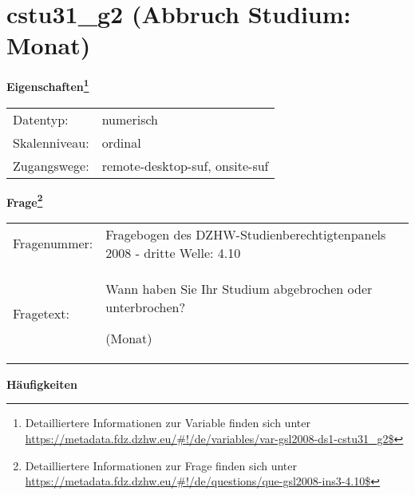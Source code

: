 
    \setcounter{footnote}{0}

    \vspace*{-1.8cm}
	\section{cstu31\_g2 (Abbruch Studium: Monat)}
	\label{section:cstu31_g2}



    \vspace*{0.5cm}
    \noindent\textbf{Eigenschaften\footnote{Detailliertere Informationen zur Variable finden sich unter
		\url{https://metadata.fdz.dzhw.eu/\#!/de/variables/var-gsl2008-ds1-cstu31_g2$}}}\\
	\begin{tabularx}{\hsize}{@{}lX}
	Datentyp: & numerisch \\
	Skalenniveau: & ordinal \\
	Zugangswege: &
	  remote-desktop-suf, 
	  onsite-suf
 \\
    \end{tabularx}



				\vspace*{0.5cm}
                \noindent\textbf{Frage\footnote{Detailliertere Informationen zur Frage finden sich unter
		              \url{https://metadata.fdz.dzhw.eu/\#!/de/questions/que-gsl2008-ins3-4.10$}}}\\
				\begin{tabularx}{\hsize}{@{}lX}
					Fragenummer: &
					  Fragebogen des DZHW-Studienberechtigtenpanels 2008 - dritte Welle:
					  4.10
 \\
					Fragetext: & Wann haben Sie Ihr Studium abgebrochen oder unterbrochen?\par  (Monat) \\
				\end{tabularx}





        		\vspace*{0.5cm}
                \noindent\textbf{Häufigkeiten}

